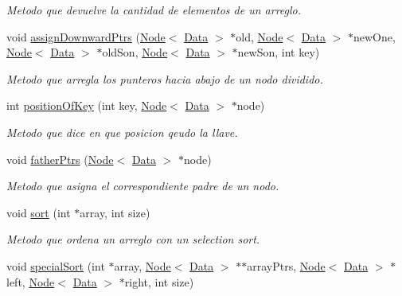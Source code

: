 \begin{DoxyCompactItemize}
\begin{DoxyCompactList}\small\item\em Metodo que devuelve la cantidad de elementos de un arreglo. \end{DoxyCompactList}\item 
void \hyperlink{classBPlusTree_a300ff0b8ea4244bc2f67a0706f0c934e}{assign\+Downward\+Ptrs} (\hyperlink{classNode}{Node}$<$ \hyperlink{main_8cpp_a0c209e815d35b218025a240523b4335b}{Data} $>$ $\ast$old, \hyperlink{classNode}{Node}$<$ \hyperlink{main_8cpp_a0c209e815d35b218025a240523b4335b}{Data} $>$ $\ast$new\+One, \hyperlink{classNode}{Node}$<$ \hyperlink{main_8cpp_a0c209e815d35b218025a240523b4335b}{Data} $>$ $\ast$old\+Son, \hyperlink{classNode}{Node}$<$ \hyperlink{main_8cpp_a0c209e815d35b218025a240523b4335b}{Data} $>$ $\ast$new\+Son, int key)
\begin{DoxyCompactList}\small\item\em Metodo que arregla los punteros hacia abajo de un nodo dividido. \end{DoxyCompactList}\item 
int \hyperlink{classBPlusTree_ac31a935a665736906ad9725b2b603f7d}{position\+Of\+Key} (int key, \hyperlink{classNode}{Node}$<$ \hyperlink{main_8cpp_a0c209e815d35b218025a240523b4335b}{Data} $>$ $\ast$node)
\begin{DoxyCompactList}\small\item\em Metodo que dice en que posicion qeudo la llave. \end{DoxyCompactList}\item 
void \hyperlink{classBPlusTree_a806305a534da3c3809849b09bf8e7feb}{father\+Ptrs} (\hyperlink{classNode}{Node}$<$ \hyperlink{main_8cpp_a0c209e815d35b218025a240523b4335b}{Data} $>$ $\ast$node)
\begin{DoxyCompactList}\small\item\em Metodo que asigna el correspondiente padre de un nodo. \end{DoxyCompactList}\item 
void \hyperlink{classBPlusTree_ad90c387310153b5199e297d38a6c9901}{sort} (int $\ast$array, int size)
\begin{DoxyCompactList}\small\item\em Metodo que ordena un arreglo con un selection sort. \end{DoxyCompactList}\item 
void \hyperlink{classBPlusTree_a73ac50b1543b2240198524fb3221f78c}{special\+Sort} (int $\ast$array, \hyperlink{classNode}{Node}$<$ \hyperlink{main_8cpp_a0c209e815d35b218025a240523b4335b}{Data} $>$ $\ast$$\ast$array\+Ptrs, \hyperlink{classNode}{Node}$<$ \hyperlink{main_8cpp_a0c209e815d35b218025a240523b4335b}{Data} $>$ $\ast$left, \hyperlink{classNode}{Node}$<$ \hyperlink{main_8cpp_a0c209e815d35b218025a240523b4335b}{Data} $>$ $\ast$right, int size)
$$
\end{DoxyCompactItemize}
